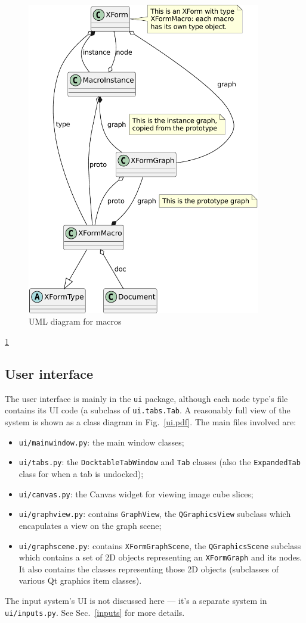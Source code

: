 \begin{figure}[ht]
\center
\includegraphics[width=4in]{macros.pdf}
\caption{UML diagram for macros}
\label{macros.pdf}
\end{figure}
\ref{macros.pdf}


\subsection{User interface}
The user interface is mainly in the \texttt{ui} package, although each
node type's file contains its UI code (a subclass of \texttt{ui.tabs.Tab}.
A reasonably full view of the system is shown as a class diagram
in Fig.~\ref{ui.pdf}.
The main files involved are:
\begin{itemize}
\item \texttt{ui/mainwindow.py}: the main window classes;
\item \texttt{ui/tabs.py}: the \texttt{DocktableTabWindow} and \texttt{Tab}
classes (also the \texttt{ExpandedTab} class for when a tab is undocked);
\item \texttt{ui/canvas.py}: the Canvas widget for viewing image cube slices;
\item \texttt{ui/graphview.py}: contains \texttt{GraphView}, the
\texttt{QGraphicsView} subclass which encapulates a view on the graph scene;
\item \texttt{ui/graphscene.py}: contains \texttt{XFormGraphScene},
the \texttt{QGraphicsScene} subclass which contains a set of 2D objects
representing an \texttt{XFormGraph} and its nodes. It also contains the
classes representing those 2D objects (subclasses of various Qt graphics item
classes).
\end{itemize}
The input system's UI is not discussed here --- it's a separate
system in \texttt{ui/inputs.py}. See Sec.~\ref{inputs} for more details.


